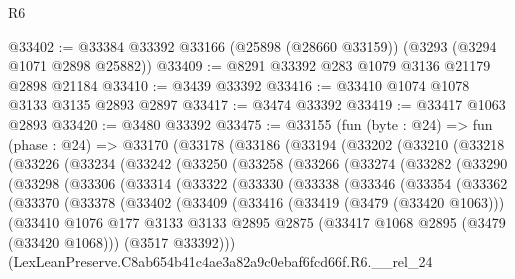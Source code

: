 \begin{lexlean}{R6}
\begin{coremodule}
@33402 := @33384 @33392 @33166 (@25898 (@28660 @33159)) (@3293 (@3294 @1071 @2898 @25882))
@33409 := @8291 @33392 @283 @1079 @3136 @21179 @2898 @21184
@33410 := @3439 @33392
@33416 := @33410 @1074 @1078 @3133 @3135 @2893 @2897
@33417 := @3474 @33392
@33419 := @33417 @1063 @2893
@33420 := @3480 @33392
@33475 := @33155
    (fun (byte : @24) =>
    fun (phase : @24) =>
    @33170
      (@33178
        (@33186
          (@33194
            (@33202
              (@33210
                (@33218
                  (@33226
                    (@33234
                      (@33242
                        (@33250
                          (@33258
                            (@33266
                              (@33274
                                (@33282
                                  (@33290
                                    (@33298
                                      (@33306
                                        (@33314
                                          (@33322
                                            (@33330
                                              (@33338
                                                (@33346
                                                  (@33354
                                                    (@33362
                                                      (@33370
                                                        (@33378
                                                          (@33402
                                                            (@33409
                                                              (@33416
                                                                (@33419 (@3479 (@33420 @1063)))
                                                                (@33410
                                                                  @1076
                                                                  @177
                                                                  @3133
                                                                  @3133
                                                                  @2895
                                                                  @2875
                                                                  (@33417
                                                                    @1068
                                                                    @2895
                                                                    (@3479 (@33420 @1068)))
                                                                  (@3517 @33392)))
                                                              (LexLeanPreserve.C8ab654b41c4ae3a82a9c0ebaf6fcd66f.R6.__rel_24

\end{coremodule}
\end{lexlean}
